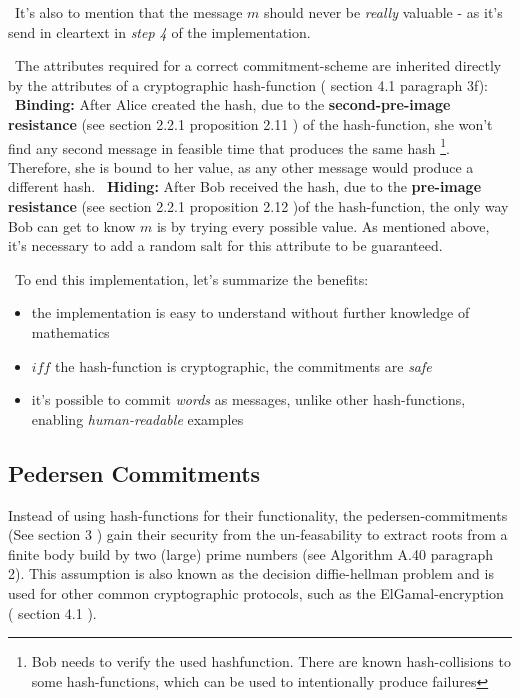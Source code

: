 ~\newline It's also to mention that the message $m$ should never be \textit{really} valuable - as it's send in cleartext in \textit{step 4} of the implementation.  

~\newline The attributes required for a correct commitment-scheme are inherited directly by the attributes of a cryptographic hash-function (\cite{Mironov05} section 4.1 paragraph 3f): 
~\newline \textbf{Binding:} After Alice created the hash, due to the \textbf{second-pre-image resistance} (see \cite{DeHa15} section 2.2.1 proposition 2.11 ) of the hash-function, she won't find any second message in feasible time that produces the same hash \footnote{Bob needs to verify the used hashfunction. There are known hash-collisions to some hash-functions, which can be used to intentionally produce failures}. Therefore, she is bound to her value, as any other message would produce a different hash.  
~\newline \textbf{Hiding:} After Bob received the hash, due to the \textbf{pre-image resistance} (see \cite{DeHa15} section 2.2.1 proposition 2.12 )of the hash-function, the only way Bob can get to know $m$ is by trying every possible value. As mentioned above, it's necessary to add a random salt for this attribute to be guaranteed.

~\newline To end this implementation, let's summarize the benefits: 
\begin{itemize}
	\item the implementation is easy to understand without further knowledge of mathematics
	\item $iff$ the hash-function is cryptographic, the commitments are \textit{safe}
	\item it's possible to commit \textit{words} as messages, unlike other hash-functions, enabling \textit{human-readable} examples  
\end{itemize} 

\subsection{Pedersen Commitments}
Instead of using hash-functions for their functionality, the pedersen-commitments (See \cite{Ped01} section 3 ) gain their security from the un-feasability to extract roots from a finite body build by two (large) prime numbers (see \cite{DeHa15} Algorithm A.40 paragraph 2). This assumption is also known as the decision diffie-hellman problem and is used for other common cryptographic protocols, such as the ElGamal-encryption (\cite{b1} section 4.1 ). 

